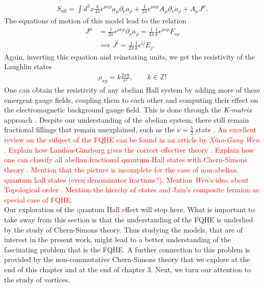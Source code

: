 \begin{align}
    S_{\text{eff}} = \int d^3x \frac{k}{4\pi} \epsilon^{\mu \nu \rho} a_{\mu} \partial_{\nu} a_{\rho} + \frac{1}{2 \pi} \epsilon^{\mu \nu \rho} A_{\mu} \partial_{\nu}a_{\rho}+ A_{\mu} J^{\mu}.
\end{align}
The equations of motion of this model lead to the relation
\begin{align}
    J^{\mu} &= \frac{1}{2\pi} \epsilon^{\mu \nu \rho} \partial_\nu a_{\rho} = \frac{1}{4\pi} \frac{1}{k} \epsilon^{\mu \nu \rho} F_{\nu \rho} \\
    &\implies J^{i} = \frac{1}{2 \pi} \frac{1}{k} \epsilon^{i j} E_{j}.
\end{align}
Again, inverting this equation and reinstating units, we get the resistivity of the Laughlin states
\begin{align}
    \rho_{xy} =k\frac{2\pi \hbar}{e^2 }, \qquad k \in \mathbb{Z}!
\end{align}
One can obtain the resistivity of any abelian Hall system by adding more of these emergent gauge fields, coupling them to each other and computing their effect on the electromagnetic background gauge field. This is done through the \textit{K-matrix} approach \cite{PhysRevB.46.2290}. Despite our understanding of the abelian system, there still remain fractional fillings that remain unexplained, such as the $\nu=\frac{5}{2}$ state \cite{Willett:1987zz}.
\textcolor{red}{An excellent review on the subject of the FQHE can be found in an article by \textit{Xiao-Gang Wen} \cite{Wen:1995qn}. Explain how Landau-Ginzburg gives the correct effective theory \cite{PhysRevLett.58.1252, Read1989, PhysRevLett.62.82, PhysRevB.43.2637}. Explain how one can classify all abelian fractional quantum Hall states with Chern-Simons theory \cite{PhysRevB.46.2290,PhysRevLett.69.953}. Mention that the picture is incomplete for the case of non-abelian quantum hall states (even denominator fractions?). Mention \textit{Wen}'s idea about Topological order \cite{TopOrderRigidStates}. Mention the hierchy of states and Jain's composite fermion as special case of FQHE. \cite{PhysRevLett.63.199, Read1994}}\\
        \indent Our exploration of the \textcolor{red}{q}uantum Hall \textcolor{red}{e}ffect will stop here. What is important to take away from this section is that the understanding of the FQHE is underlied by the study of Chern-Simons theory. Thus studying the models, that are of interest in the present work, might lead to a better understanding of the fascinating problem that is the FQHE. A further connection to this problem is provided by the non-commutative Chern-Simons theory that we explore at the end of this chapter and at the end of chapter 3. Next, we turn our attention to the study of vortices.

